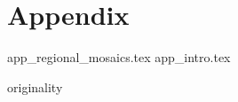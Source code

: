 \documentclass[
    10pt,
	colorful,
	boxey,
 a4paper,
]{tufte-style-thesis}
\begin{document}
\thispagestyle{empty}
\printbibliography
\cleardoublepage

\part*{Appendix}
\appendix

\setcounter{table}{0}
\setcounter{figure}{0}
\setcounter{section}{0}

\renewcommand{\thetable}{A\arabic{table}}  %
\renewcommand{\thefigure}{A\arabic{figure}}  %
\renewcommand{\thechapter}{\Alph{chapter}}
\renewcommand{\thesection}{\Alph{section}}

{app_regional_mosaics.tex}
{app_intro.tex}

\cleardoublepage


\thispagestyle{empty}
{originality}
\end{document}
